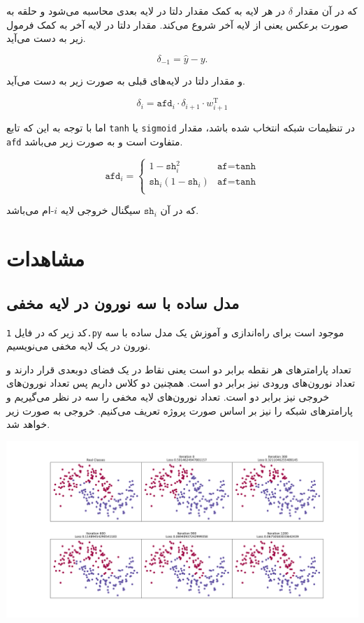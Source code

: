 \documentclass[a4paper, 12pt]{article}
\theoremstyle{definition}
\begin{document}
که در آن مقدار
$\delta$
در هر لایه به کمک مقدار دلتا در لایه بعدی محاسبه می‌شود و حلقه به صورت برعکس یعنی از لایه آخر شروع می‌کند. مقدار دلتا در لایه آخر به کمک فرمول زیر به دست می‌آید.

\[ \delta_{-1} = \hat{y} - y. \]

و مقدار دلتا در لایه‌های قبلی به صورت زیر به دست می‌آید.

\[ \delta_{i} = \texttt{afd}_i \cdot \delta_{i + 1} \cdot w_{i + 1}^{\operatorname{T}} \]

اما با توجه به این که تابع
\texttt{tanh}
یا
\texttt{sigmoid}
در تنظیمات شبکه انتخاب شده باشد، مقدار
\texttt{afd}
متفاوت است و به صورت زیر می‌باشد.

\[
    \texttt{afd}_i = \begin{cases}
        1 - \texttt{sh}_i^2              & \texttt{af} = \texttt{tanh} \\
        \texttt{sh}_i(1 - \texttt{sh}_i) & \texttt{af} = \texttt{tanh} \\
    \end{cases}
\]

که در آن
$\texttt{sh}_i$
سیگنال خروجی لایه
$i$-ام
می‌باشد.

\section{مشاهدات}

\subsection{مدل ساده با سه نورون در لایه مخفی}
کد زیر که در فایل
\texttt{1.py}
موجود است برای راه‌اندازی و آموزش یک مدل ساده با سه نورون در یک لایه مخفی می‌نویسیم.

\LTR

\RTL

تعداد پارامترهای هر نقطه برابر دو است یعنی نقاط در یک فضای دوبعدی قرار دارند و تعداد نورون‌های ورودی نیز برابر دو است. همچنین دو کلاس داریم پس تعداد نورون‌های خروجی نیز برابر دو است. تعداد نورون‌های لایه مخفی را سه در نظر می‌گیریم و پارامترهای شبکه را نیز بر اساس صورت پروژه تعریف می‌کنیم. خروجی به صورت زیر خواهد شد.

\begin{center}
    \includegraphics[width=\textwidth]{figs/1.png}
\end{center}
\end{document}
